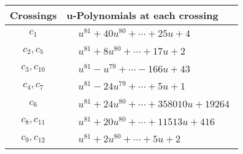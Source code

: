 \documentclass[1p]{elsarticle_modified}
\theoremstyle{definition}
\begin{document}
\begin{tabular}{m{50pt}|m{274pt}}
Crossings & \hspace{64pt}u-Polynomials at each crossing \\
\hline $$\begin{aligned}c_{1}\end{aligned}$$&$\begin{aligned}
&u^{81}+40 u^{80}+\cdots+25 u+4
\end{aligned}$\\
\hline $$\begin{aligned}c_{2},c_{5}\end{aligned}$$&$\begin{aligned}
&u^{81}+8 u^{80}+\cdots+17 u+2
\end{aligned}$\\
\hline $$\begin{aligned}c_{3},c_{10}\end{aligned}$$&$\begin{aligned}
&u^{81}- u^{79}+\cdots-166 u+43
\end{aligned}$\\
\hline $$\begin{aligned}c_{4},c_{7}\end{aligned}$$&$\begin{aligned}
&u^{81}-24 u^{79}+\cdots+5 u+1
\end{aligned}$\\
\hline $$\begin{aligned}c_{6}\end{aligned}$$&$\begin{aligned}
&u^{81}+24 u^{80}+\cdots+358010 u+19264
\end{aligned}$\\
\hline $$\begin{aligned}c_{8},c_{11}\end{aligned}$$&$\begin{aligned}
&u^{81}+20 u^{80}+\cdots+11513 u+416
\end{aligned}$\\
\hline $$\begin{aligned}c_{9},c_{12}\end{aligned}$$&$\begin{aligned}
&u^{81}+2 u^{80}+\cdots+5 u+2
\end{aligned}$\\
\hline
\end{tabular}\\~\\
\newpage\renewcommand{\arraystretch}{1}
\end{document}
